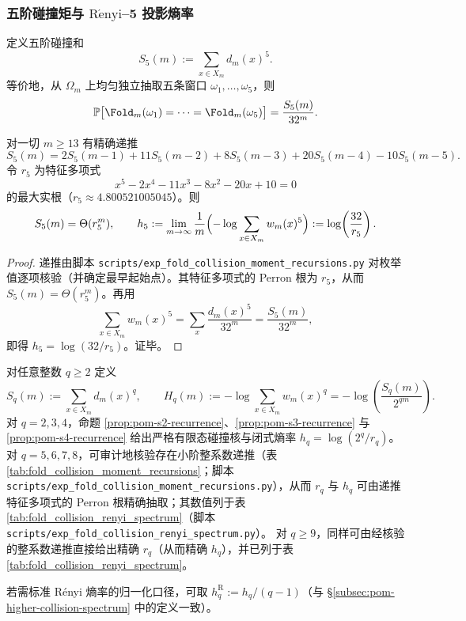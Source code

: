 \subsubsection{五阶碰撞矩与 \texorpdfstring{$\mathrm{R\acute{e}nyi}$}{Renyi}--5 投影熵率}\label{subsec:pom-s5}
\begin{definition}[五阶折叠碰撞矩]\label{def:pom-s5}
定义五阶碰撞和
$$
S_5(m):=\sum_{x\in X_m} d_m(x)^5.
$$
等价地，从 \(\Omega_m\) 上均匀独立抽取五条窗口 \(\omega_1,\dots,\omega_5\)，则
$$
\mathbb{P}\bigl[\Fold_m(\omega_1)=\cdots=\Fold_m(\omega_5)\bigr]=\frac{S_5(m)}{32^m}.
$$
\end{definition}

\begin{proposition}\label{prop:pom-s5-recurrence}
对一切 \(m\ge 13\) 有精确递推
$$
S_5(m)=2S_5(m-1)+11S_5(m-2)+8S_5(m-3)+20S_5(m-4)-10S_5(m-5).
$$
令 \(r_5\) 为特征多项式
$$
x^5-2x^4-11x^3-8x^2-20x+10=0
$$
的最大实根（\(r_5\approx 4.800521005045\)）。则
$$
S_5(m)=\Theta(r_5^m),
\qquad
h_5:=\lim_{m\to\infty}\frac{1}{m}\Bigl(-\log\sum_{x\in X_m}w_m(x)^5\Bigr)
:=\log\!\left(\frac{32}{r_5}\right).
$$
\end{proposition}
\begin{proof}
递推由脚本 \texttt{scripts/exp\_fold\_collision\_moment\_recursions.py} 对枚举值逐项核验（并确定最早起始点）。其特征多项式的 Perron 根为 \(r_5\)，从而 \(S_5(m)=\Theta(r_5^m)\)。再用
$$
\sum_{x\in X_m}w_m(x)^5=\sum_x\frac{d_m(x)^5}{32^m}=\frac{S_5(m)}{32^m},
$$
即得 \(h_5=\log(32/r_5)\)。证毕。
\end{proof}

\begin{remark}[\texorpdfstring{$\mathrm{R\acute{e}nyi}$}{Renyi} 指纹谱：从 \texorpdfstring{$q=2,3$}{q=2,3} 到更高阶]\label{rem:pom-renyi-spectrum}
对任意整数 \(q\ge 2\) 定义
$$
S_q(m):=\sum_{x\in X_m} d_m(x)^q,\qquad
H_q(m):=-\log\sum_{x\in X_m}w_m(x)^q=-\log\!\left(\frac{S_q(m)}{2^{qm}}\right).
$$
对 \(q=2,3,4\)，命题 \ref{prop:pom-s2-recurrence}、\ref{prop:pom-s3-recurrence} 与 \ref{prop:pom-s4-recurrence} 给出严格有限态碰撞核与闭式熵率 \(h_q=\log(2^q/r_q)\)。
对 \(q=5,6,7,8\)，可审计地核验存在小阶整系数递推（表 \ref{tab:fold_collision_moment_recursions}；脚本 \texttt{scripts/exp\_fold\_collision\_moment\_recursions.py}），从而 \(r_q\) 与 \(h_q\) 可由递推特征多项式的 Perron 根精确抽取；其数值列于表 \ref{tab:fold_collision_renyi_spectrum}（脚本 \texttt{scripts/exp\_fold\_collision\_renyi\_spectrum.py}）。
对 \(q\ge 9\)，同样可由经核验的整系数递推直接给出精确 \(r_q\)（从而精确 \(h_q\)），并已列于表 \ref{tab:fold_collision_renyi_spectrum}。
\par
若需标准 Rényi 熵率的归一化口径，可取 \(h_q^{\mathrm{R}}:=h_q/(q-1)\)（与 \S\ref{subsec:pom-higher-collision-spectrum} 中的定义一致）。
\end{remark}


